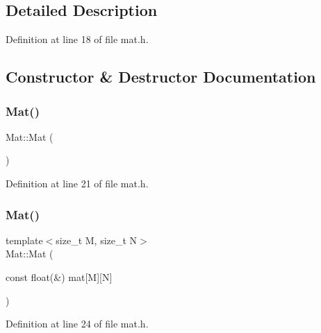\subsection{Detailed Description}


Definition at line 18 of file mat.\+h.



\subsection{Constructor \& Destructor Documentation}
\mbox{\label{class_mat_a7205342eec3270c1aa954f35d8af27c7}} 
\subsubsection{\texorpdfstring{Mat()}{Mat()}\hspace{0.1cm}{\footnotesize\ttfamily [1/5]}}
{\footnotesize\ttfamily Mat\+::\+Mat (\begin{DoxyParamCaption}{ }\end{DoxyParamCaption})\hspace{0.3cm}{\ttfamily [inline]}}



Definition at line 21 of file mat.\+h.

\mbox{\label{class_mat_af844a885aedf39d90ad27b2f34333791}} 
\subsubsection{\texorpdfstring{Mat()}{Mat()}\hspace{0.1cm}{\footnotesize\ttfamily [2/5]}}
{\footnotesize\ttfamily template$<$size\+\_\+t M, size\+\_\+t N$>$ \\
Mat\+::\+Mat (\begin{DoxyParamCaption}\item[{const float(\&)}]{mat\mbox{[}\+M\mbox{]}\mbox{[}\+N\mbox{]} }\end{DoxyParamCaption})\hspace{0.3cm}{\ttfamily [inline]}}



Definition at line 24 of file mat.\+h.

